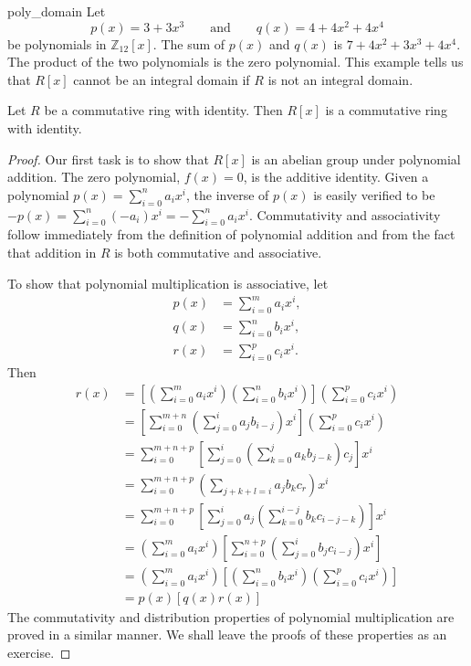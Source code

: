 \begin{example}{poly_domain}
Let
\[
p(x) = 3 + 3 x^3
\qquad \text{and} \qquad
q(x) = 4 + 4 x^2 + 4 x^4
\]
be polynomials in ${\mathbb Z}_{12}[x]$. The sum of $p(x)$ and $q(x)$ is $7 + 4 x^2 + 3 x^3 + 4 x^4$.  The product of the two polynomials is  the zero polynomial.  This example tells us that $R[x]$ cannot be an integral domain if $R$ is not an integral domain.
\mbox{\hspace{1in}}
\end{example}
 
\medskip
 
\begin{theorem}\label{poly_theorem_1}
Let $R$ be a commutative ring with identity.  Then $R[x]$ is a commutative ring with identity.
\end{theorem}

\begin{proof}
Our first task is to show that $R[x]$ is an abelian group under polynomial addition.  The zero polynomial, $f(x) = 0$, is the additive identity.  Given a polynomial $p(x) = \sum_{i = 0}^{n} a_i x^i$, the inverse of $p(x)$ is easily verified to be $-p(x) = \sum_{i = 0}^{n} (-a_i) x^i = -\sum_{i = 0}^{n} a_i x^i$.  Commutativity and associativity follow immediately from the definition of polynomial addition and from the fact that addition in $R$ is both commutative and associative.

To show that polynomial multiplication is associative, let
\begin{align*}
p(x) & = \sum_{i=0}^{m} a_i x^i, \\
q(x) & = \sum_{i=0}^{n} b_i x^i, \\
r(x) & = \sum_{i=0}^{p} c_i x^i. 
\end{align*}
Then
\begin{align*}
[p(x) q(x)] r(x) 
& =
\left[
\left(
\sum_{i=0}^{m} a_i x^i 
\right)
\left( 
\sum_{i=0}^{n} b_i x^i
\right)
\right]
\left(
\sum_{i=0}^{p} c_i x^i
\right) \\
& =
\left[
\sum_{i=0}^{m+n}
\left( 
\sum_{j=0}^{i} a_j b_{i-j}
\right) x^i
\right]
\left(
\sum_{i=0}^{p} c_i x^i
\right) \\
& =
\sum_{i=0}^{m+n+p} 
\left[
\sum_{j=0}^{i}
\left(
\sum_{k=0}^j a_k b_{j-k} 
\right) c_j
\right]
 x^i \\
& =
\sum_{i=0}^{m+n+p} 
\left(
\sum_{j+k+l=i} a_j b_k c_r
\right) x^i \\
& =
\sum_{i=0}^{m+n+p}
\left[
\sum_{j=0}^{i} a_j 
\left(
\sum_{k=0}^{i-j} b_k c_{i-j-k}
\right)
\right]  x^i \\
& =
\left(
\sum_{i=0}^{m} a_i x^i 
\right)
\left[
\sum_{i=0}^{n+p} 
\left(
\sum_{j=0}^{i} b_j c_{i-j}
\right) x^i
\right] \\
& =
\left(
\sum_{i=0}^{m} a_i x^i 
\right)
\left[
\left( 
\sum_{i=0}^{n} b_i x^i
\right)
\left(
\sum_{i=0}^{p} c_i x^i
\right)
\right] \\
& = p(x) [ q(x) r(x) ]
\end{align*}
The commutativity and distribution properties of polynomial multiplication are proved in a similar manner.  We shall leave the proofs of these properties as an exercise.
\end{proof}

